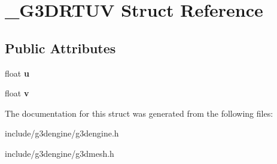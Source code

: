 \hypertarget{struct__G3DRTUV}{}\section{\+\_\+\+G3\+D\+R\+T\+UV Struct Reference}
\label{struct__G3DRTUV}
\subsection*{Public Attributes}
\begin{DoxyCompactItemize}
\item 
\mbox{\label{struct__G3DRTUV_a98bb15b048e67d292c392bfdaa94696f}} 
float {\bfseries u}
\item 
\mbox{\label{struct__G3DRTUV_a964c1c1830f2db1459970dcb671a50fb}} 
float {\bfseries v}
\end{DoxyCompactItemize}


The documentation for this struct was generated from the following files\+:\begin{DoxyCompactItemize}
\item 
include/g3dengine/g3dengine.\+h\item 
include/g3dengine/g3dmesh.\+h\end{DoxyCompactItemize}
